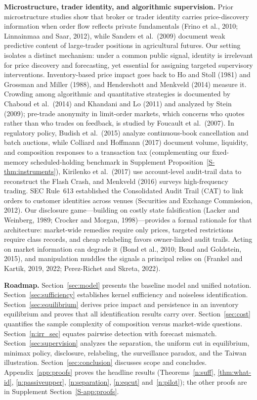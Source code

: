 \documentclass[11pt,letterpaper]{article}
\theoremstyle{definition}
\begin{document}
\textbf{Microstructure, trader identity, and algorithmic supervision.} Prior microstructure studies show that broker or trader identity carries price-discovery information when order flow reflects private fundamentals (Frino et al., 2010; Linnainmaa and Saar, 2012), while Sanders et al.\ (2009) document weak predictive content of large-trader positions in agricultural futures. Our setting isolates a distinct mechanism: under a common public signal, identity is irrelevant for price discovery and forecasting, yet essential for assigning targeted supervisory interventions. Inventory-based price impact goes back to Ho and Stoll (1981) and Grossman and Miller (1988), and Hendershott and Menkveld (2014) measure it. Crowding among algorithmic and quantitative strategies is documented by Chaboud et al.\ (2014) and Khandani and Lo (2011) and analyzed by Stein (2009); pre-trade anonymity in limit-order markets, which concerns who quotes rather than who trades on feedback, is studied by Foucault et al.\ (2007). In regulatory policy, Budish et al.\ (2015) analyze continuous-book cancellation and batch auctions, while Colliard and Hoffmann (2017) document volume, liquidity, and composition responses to a transaction tax (complementing our fixed-memory scheduled-holding benchmark in Supplement Proposition~\ref{S-thm:instruments}), Kirilenko et al.\ (2017) use account-level audit-trail data to reconstruct the Flash Crash, and Menkveld (2016) surveys high-frequency trading. SEC Rule~613 established the Consolidated Audit Trail (CAT) to link orders to customer identities across venues (Securities and Exchange Commission, 2012). Our disclosure game---building on costly state falsification (Lacker and Weinberg, 1989; Crocker and Morgan, 1998)---provides a formal rationale for that architecture: market-wide remedies require only prices, targeted restrictions require class records, and cheap relabeling favors owner-linked audit trails. Acting on market information can degrade it (Bond et al., 2010; Bond and Goldstein, 2015), and manipulation muddles the signals a principal relies on (Frankel and Kartik, 2019, 2022; Perez-Richet and Skreta, 2022).

\textbf{Roadmap.} Section~\ref{sec:model} presents the baseline model and unified notation. Section~\ref{sec:sufficiency} establishes kernel sufficiency and noiseless identification. Section~\ref{sec:equilibrium} derives price impact and persistence in an inventory equilibrium and proves that all identification results carry over. Section~\ref{sec:cost} quantifies the sample complexity of composition versus market-wide questions. Section~\ref{n:irr_sec} equates pairwise detection with forecast mismatch. Section~\ref{sec:supervision} analyzes the separation, the uniform cut in equilibrium, minimax policy, disclosure, relabeling, the surveillance paradox, and the Taiwan illustration. Section~\ref{sec:conclusion} discusses scope and concludes. Appendix~\ref{app:proofs} proves the headline results (Theorems~\ref{n:suff}, \ref{thm:what-id}, \ref{n:passiveupper}, \ref{n:separation}, \ref{n:eqcut} and~\ref{n:pilot}); the other proofs are in Supplement Section~\ref{S-app:proofs}.
\end{document}
